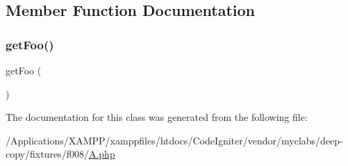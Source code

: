 \subsection{Member Function Documentation}
\mbox{\label{class_deep_copy_1_1f008_1_1_a_a4d92c456d98bc078936e71714ca1840f}} 
\subsubsection{\texorpdfstring{get\+Foo()}{getFoo()}}
{\footnotesize\ttfamily get\+Foo (\begin{DoxyParamCaption}{ }\end{DoxyParamCaption})}



The documentation for this class was generated from the following file\+:\begin{DoxyCompactItemize}
\item 
/\+Applications/\+X\+A\+M\+P\+P/xamppfiles/htdocs/\+Code\+Igniter/vendor/myclabs/deep-\/copy/fixtures/f008/\mbox{\hyperlink{f008_2_a_8php}{A.\+php}}\end{DoxyCompactItemize}
